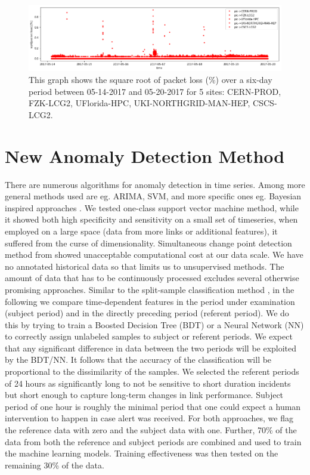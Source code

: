 \documentclass[5p]{elsarticle}
\begin{document}
\begin{figure}[htbp]
    \centering
    \includegraphics[width=\linewidth]{real_data_5_links.png}
    \caption{This graph shows the square root of packet loss (\%)  over a six-day period between 05-14-2017 and 05-20-2017 for 5 sites: CERN-PROD, FZK-LCG2, UFlorida-HPC, UKI-NORTHGRID-MAN-HEP, CSCS-LCG2.}
    \label{fig:real_five}
\end{figure}

\section{New Anomaly Detection Method}

There are numerous algorithms for anomaly detection in time series. Among more general methods used are eg. ARIMA, SVM, and more specific ones eg. Bayesian inspired approaches \cite{sedam}. We tested one-class support vector machine method, while it showed both high specificity and sensitivity on a small set of timeseries, when employed on a large space (data from more links or additional features), it suffered from the curse of dimensionality. Simultaneous change point detection method from \cite{sedam} showed unacceptable computational cost at our data scale. We have no annotated historical data so that limits us to unsupervised methods. The amount of data that has to be continuously processed excludes several otherwise promising approaches. Similar to the split-sample classification method \cite{sest}, in the following we compare time-dependent features in the period under examination (subject period) and in the directly preceding period (referent period). We do this by trying to train a Boosted Decision Tree (BDT)\cite{osam} or a Neural Network (NN) to correctly assign unlabeled samples to subject or referent periods.  We expect that any significant difference in data between the two periods will be exploited by the BDT/NN. It follows that the accuracy of the classification will be proportional to the dissimilarity of the samples. We selected the referent periods of 24 hours as significantly long to not be sensitive to short duration incidents but short enough to capture long-term changes in link performance. Subject period of one hour is roughly the minimal period that one could expect a human intervention to happen in case alert was received. For both approaches, we flag the reference data with zero and the subject data with one.  Further, 70\% of the data from both the reference and subject periods are combined and used to train the machine learning models. Training effectiveness was then tested on the remaining 30\% of the data.
\end{document}
